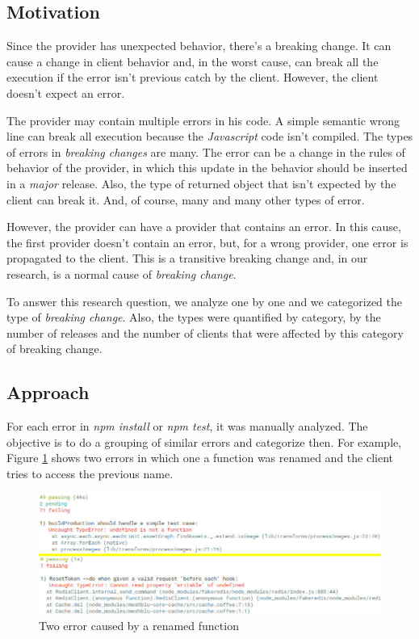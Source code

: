 \subsection{Motivation}
\label{mot:rq2}

Since the provider has unexpected behavior, there's a breaking change. It can cause a change in client behavior and, in the worst cause, can break all the execution if the error isn't previous catch by the client. However, the client doesn't expect an error.

The provider may contain multiple errors in his code. A simple semantic wrong line can break all execution because the \textit{Javascript} code isn't compiled. The types of errors in \textit{breaking changes} are many.  The error can be a change in the rules of behavior of the provider, in which this update in the behavior should be inserted in a \textit{major} release. Also, the type of returned object that isn't expected by the client can break it. And, of course, many and many other types of error.

However, the provider can have a provider that contains an error. In this cause, the first provider doesn't contain an error, but, for a wrong provider, one error is propagated to the client. This is a transitive breaking change and, in our research, is a normal cause of \textit{breaking change}.

To answer this research question, we analyze one by one and we categorized the type of \textit{breaking change}. Also, the types were quantified by category, by the number of releases and the number of clients that were affected by this category of breaking change.

\subsection{Approach}
\label{apr:rq2}

For each error in \textit{npm install} or \textit{npm test}, it was manually analyzed. The objective is to do a grouping of similar errors and categorize then. For example, Figure \ref{fig:error_category} shows two errors in which one a function was renamed and the client tries to access the previous name.

\begin{figure}[!h]
    \centering
    \includegraphics[scale=0.5]{figuras/error_category.jpeg}
    \caption{Two error caused by a renamed function}
    \label{fig:error_category}
\end{figure}


